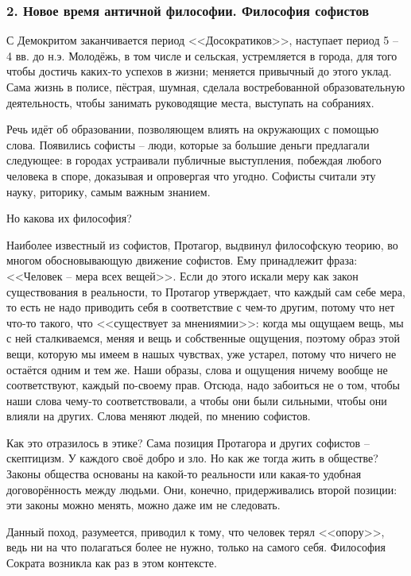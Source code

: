 \documentclass[a4paper, 12pt]{article} %
\begin{document}
\subsubsection*{2. Новое время античной философии. Философия софистов}

С Демокритом заканчивается период <<Досократиков>>, наступает период 5 -- 4 вв. до н.э. Молодёжь, в том числе и сельская, устремляется в города, для того чтобы достичь каких-то успехов в жизни; меняется привычный до этого уклад. Сама жизнь в полисе, пёстрая, шумная, сделала востребованной образовательную деятельность, чтобы занимать руководящие места, выступать на собраниях.

Речь идёт об образовании, позволяющем влиять на окружающих с помощью слова. Появились софисты -- люди, которые за большие деньги предлагали следующее: в городах устраивали публичные выступления, побеждая любого человека в споре, доказывая и опровергая что угодно. Софисты считали эту науку, риторику, самым важным знанием.

Но какова их философия? 

Наиболее известный из софистов, Протагор, выдвинул философскую теорию, во многом обосновывающую движение софистов. Ему принадлежит фраза: <<Человек -- мера всех вещей>>. Если до этого искали меру как закон существования в реальности, то Протагор утверждает, что каждый сам себе мера, то есть не надо приводить себя в соответствие с чем-то другим, потому что нет что-то такого, что <<существует за мнениямии>>: когда мы ощущаем вещь, мы с ней сталкиваемся, меняя и вещь и собственные ощущения, поэтому образ этой вещи, которую мы имеем в нашых чувствах, уже устарел, потому что ничего не остаётся одним и тем же. Наши образы, слова и ощущения ничему вообще не соответствуют, каждый по-своему прав.
Отсюда, надо забоиться не о том, чтобы наши слова чему-то соответствовали, а чтобы они были сильными, чтобы они влияли на других. Слова меняют людей, по мнению софистов.

Как это отразилось в этике? Сама позиция Протагора и других софистов -- скептицизм. У каждого своё добро и зло. Но как же тогда жить в обществе? Законы общества основаны на какой-то реальности или какая-то удобная договорённость между людьми. Они, конечно, придерживались второй позиции: эти законы можно менять, можно даже им не следовать.

Данный поход, разумеется, приводил к тому, что человек терял <<опору>>, ведь ни на что полагаться более не нужно, только на самого себя. Философия Сократа возникла как раз в этом контексте.  
\end{document}
